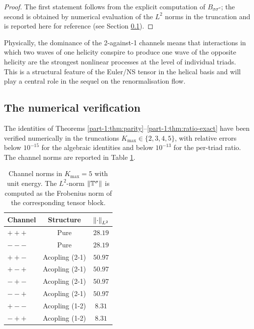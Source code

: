 \begin{proof}
The first statement follows from the explicit computation of 
$B_{\sigma\sigma''}$; the second is obtained by numerical evaluation 
of the $L^2$ norms in the truncation and is reported here for 
reference (see Section \ref{part-1:ssec:numeric-hierarchy}).
\end{proof}

\begin{remark}\label{part-1:rem:hierarchy-physical}
Physically, the dominance of the 2-against-1 channels means that 
interactions in which two waves of one helicity conspire to produce 
one wave of the opposite helicity are the strongest nonlinear 
processes at the level of individual triads. This is a structural 
feature of the Euler/NS tensor in the helical basis and will play a 
central role in the sequel on the renormalisation flow.
\end{remark}

\subsection{The numerical verification}
\label{part-1:ssec:numeric-hierarchy}

The identities of Theorems \ref{part-1:thm:parity}--\ref{part-1:thm:ratio-exact} 
have been verified numerically in the truncations $K_{\max}\in\{2,3,4,5\}$, 
with relative errors below $10^{-15}$ for the algebraic identities and 
below $10^{-13}$ for the per-triad ratio. The channel norms are 
reported in Table \ref{part-1:tab:channel-norms}.

\begin{table}[h]
\centering
\caption{Channel norms in $K_{\max}=5$ with unit energy. The 
$L^2$-norm $\left\lVert \mathbb{T}^\sigma \right\rVert$ is computed as the Frobenius norm of 
the corresponding tensor block.}
\label{part-1:tab:channel-norms}
\begin{tabular}{lcc}
\toprule
Channel & Structure & $\left\lVert \cdot \right\rVert_{L^2}$ \\
\midrule
$+++$ & Pure & $28.19$ \\
$---$ & Pure & $28.19$ \\
$++-$ & Acopling (2-1) & $50.97$ \\
$+-+$ & Acopling (2-1) & $50.97$ \\
$-+-$ & Acopling (2-1) & $50.97$ \\
$--+$ & Acopling (2-1) & $50.97$ \\
$+--$ & Acopling (1-2) & $8.31$ \\
$-++$ & Acopling (1-2) & $8.31$ \\
\bottomrule
\end{tabular}
\end{table}

